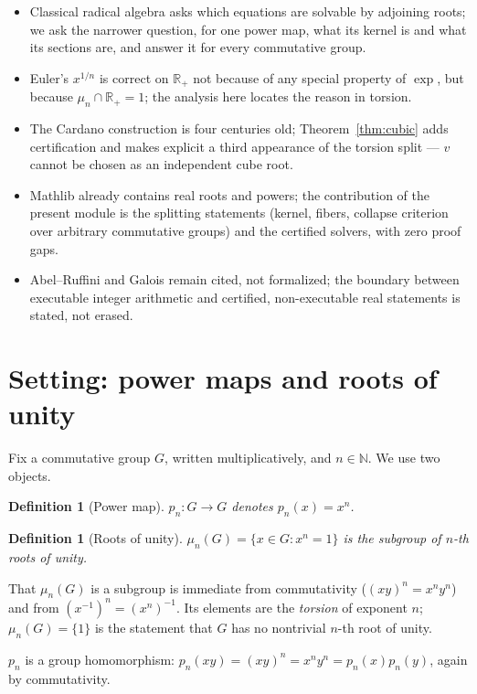\documentclass[submission,noinfoline]{jsfds}
\newtheorem{definition}[theorem]{Definition}
\begin{document}
\begin{itemize}
\item Classical radical algebra asks which equations are solvable by
adjoining roots; we ask the narrower question, for one power map, what
its kernel is and what its sections are, and answer it for every
commutative group.
\item Euler's $x^{1/n}$ is correct on $\mathbb R_+$ not because of any
special property of $\exp$, but because $\mu_n\cap\mathbb R_+=1$; the
analysis here locates the reason in torsion.
\item The Cardano construction is four centuries old;
Theorem~\ref{thm:cubic} adds certification and makes explicit a third
appearance of the torsion split --- $v$ cannot be chosen as an
independent cube root.
\item Mathlib already contains real roots and powers; the contribution
of the present module is the splitting statements (kernel, fibers,
collapse criterion over arbitrary commutative groups) and the certified
solvers, with zero proof gaps.
\item Abel--Ruffini and Galois remain cited, not formalized; the
boundary between executable integer arithmetic and certified,
non-executable real statements is stated, not erased.
\end{itemize}

\section{Setting: power maps and roots of unity}\label{sec:setting}

Fix a commutative group $G$, written multiplicatively, and $n\in\mathbb N$.
We use two objects.

\begin{definition}[Power map]\label{def:power}
$p_n\colon G\to G$ denotes $p_n(x)=x^n$.
\end{definition}
\begin{definition}[Roots of unity]\label{def:mu}
$\mu_n(G)=\{x\in G:x^n=1\}$ is the subgroup of $n$-th roots of unity.
\end{definition}

That $\mu_n(G)$ is a subgroup is immediate from commutativity
($(xy)^n=x^ny^n$) and from $(x^{-1})^n=(x^n)^{-1}$. Its elements are
the \emph{torsion} of exponent $n$; $\mu_n(G)=\{1\}$ is the statement that
$G$ has no nontrivial $n$-th root of unity.

$p_n$ is a group homomorphism: $p_n(xy)=(xy)^n=x^ny^n=p_n(x)p_n(y)$,
again by commutativity.
\end{document}
